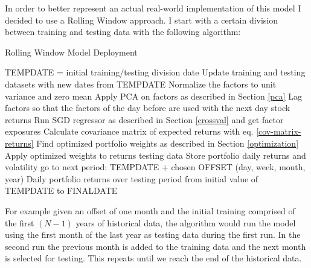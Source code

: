 In order to better represent an actual real-world implementation of this model I decided to use a Rolling Window approach. I start with a certain division between training and testing data with the following algorithm:
\begin{algorithm}
	\caption{Rolling Window Model Deployment}
	\begin{algorithmic}[1]
		\STATE TEMPDATE = initial training/testing division date
		\STATE Update training and testing datasets with new dates from TEMPDATE
		\STATE Normalize the factors to unit variance and zero mean
		\STATE Apply PCA on factors as described in Section \ref{pca}
		\STATE Lag factors so that the factors of the day before are used with the next day stock returns
		\STATE Run SGD regressor as described in Section \ref{crossval} and get factor exposures
		\STATE Calculate covariance matrix of expected returns with eq. \eqref{cov-matrix-returns}
		\STATE Find optimized portfolio weights as described in Section \ref{optimization}
		\STATE Apply optimized weights to returns testing data
		\STATE Store portfolio daily returns and volatility
		\STATE go to next period: TEMPDATE + chosen OFFSET (day, week, month, year)
		\ENDWHILE
		\RETURN Daily portfolio returns over testing period from initial value of TEMPDATE to FINALDATE
	\end{algorithmic}
\end{algorithm}


For example given an offset of one month and the initial training comprised of the first $(N - 1)$ years of historical data, the algorithm would run the model using the first month of the last year as testing data during the first run. In the second run the previous month is added to the training data and the next month is selected for testing. This repeats until we reach the end of the historical data.